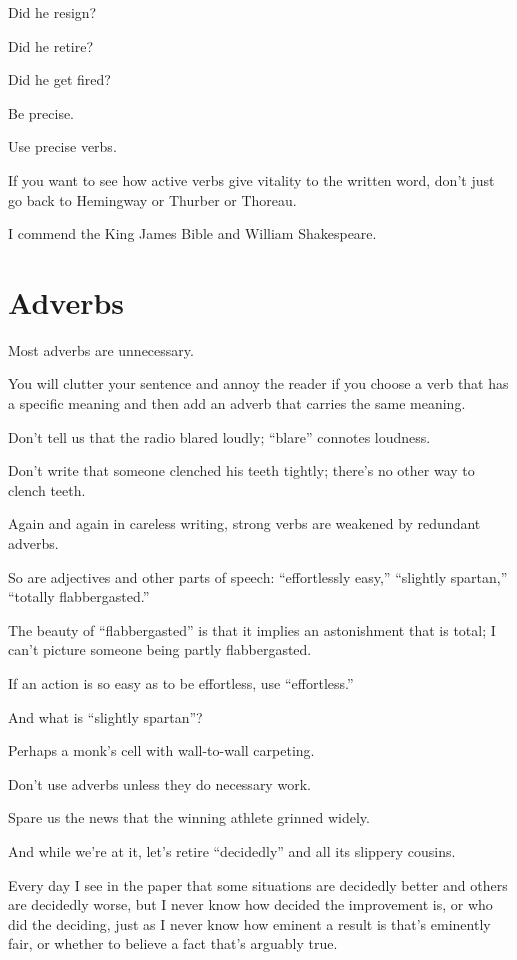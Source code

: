 \documentclass{book}
\numberwithin{equation}{section}
\begin{document}
Did he resign?

Did he retire?

Did he get fired?

Be precise.

Use precise verbs.

%
If you want to see how active verbs give vitality to the written word, don't just go back to Hemingway or Thurber or Thoreau.

I commend the King James Bible and William Shakespeare.

\section{Adverbs}
Most adverbs are unnecessary.

You will clutter your sentence and annoy the reader if you choose a verb that has a specific meaning and then add an adverb that carries the same meaning.

Don't tell us that the radio blared loudly; ``blare'' connotes loudness.

Don't write that someone clenched his teeth tightly; there's no other way to clench teeth.

Again and again in careless writing, strong verbs are weakened by redundant adverbs.

So are adjectives and other parts of speech: ``effortlessly easy,'' ``slightly spartan,'' ``totally flabbergasted.''

The beauty of ``flabbergasted'' is that it implies an astonishment that is total; I can't picture someone being partly flabbergasted.

If an action is so easy as to be effortless, use ``effortless.''

And what is ``slightly spartan''?

Perhaps a monk's cell with wall-to-wall carpeting.

Don't use adverbs unless they do necessary work.

Spare us the news that the winning athlete grinned widely.

%
And while we're at it, let's retire ``decidedly'' and all its slippery cousins.

Every day I see in the paper that some situations are decidedly better and others are decidedly worse, but I never know how decided the improvement is, or who did the deciding, just as I never know how eminent a result is that's eminently fair, or whether to believe a fact that's arguably true.
\end{document}
